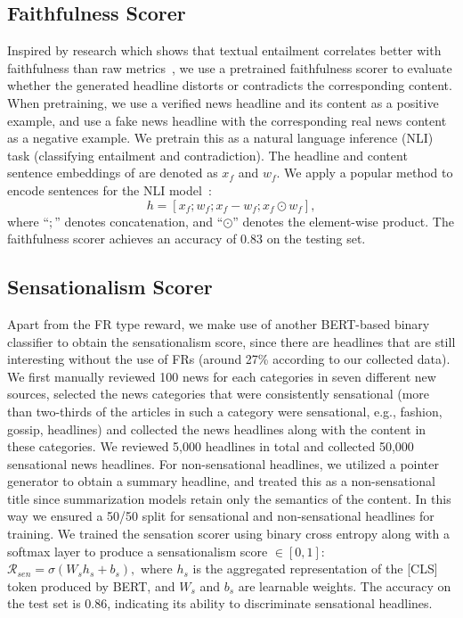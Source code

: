 \subsection{Faithfulness Scorer}
\label{subsec_faithfulness_scorer}
Inspired by research which shows that textual entailment correlates better with
faithfulness than raw metrics~\cite{falke-etal-2019-ranking}, we use a
pretrained faithfulness scorer to evaluate whether the generated headline
distorts or contradicts the corresponding content. 
When pretraining, we use a verified news headline and its content as a
positive example, and use a fake news headline with the corresponding real news
content as a negative example. 
We pretrain this as a natural language inference (NLI) task (classifying
entailment and contradiction). %
The headline and content sentence embeddings of are denoted as $x_f$ and $w_f$.
We apply a popular method to encode sentences for the NLI model~\cite{infersent}:
\begin{equation}
    h = [x_f; w_f; x_f - w_f; x_f \odot w_f],
    \label{infersent}
\end{equation}
where ``$;$'' denotes concatenation, and ``$\odot$'' denotes the element-wise product. The faithfulness scorer achieves an accuracy of 0.83 on the testing set.

\subsection{Sensationalism Scorer}
\label{subsec_sensation_scorer}
Apart from the FR type reward, we make use of another BERT-based binary
classifier to obtain the sensationalism score, since there are headlines that
are still interesting without the use of FRs (around 27\% according to our
collected data). 
We first manually reviewed 100 news for each categories in seven different new
sources, selected the news categories that were consistently sensational (more
than two-thirds of the articles in such a category were sensational, e.g., fashion, gossip,
headlines) and collected the news headlines along with the content in these
categories. We reviewed 5,000 headlines in total and collected 50,000
sensational news headlines.
For non-sensational headlines, we utilized a pointer generator to obtain a
summary headline, and treated this as a non-sensational title since summarization
models retain only the semantics of the content. In this way we ensured a 50/50
split for sensational and non-sensational headlines for training.
We trained the sensation scorer using binary cross entropy along with a softmax
layer to produce a sensationalism score $\in [0, 1]$:
$\mathcal{R}_{\mathit{sen}} = \sigma( W_{s} h_s + b_s ), $
where ${h_s}$ is the aggregated representation of the [CLS] token produced by
BERT, and $W_s$ and $b_s$ are learnable weights.
The accuracy on the test set is 0.86, indicating its ability to discriminate
sensational headlines.

